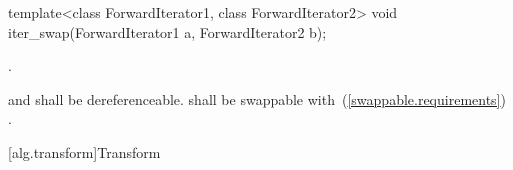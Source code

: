 \begin{removedblock}
%
\begin{itemdecl}
template<class ForwardIterator1, class ForwardIterator2>
  void iter_swap(ForwardIterator1 a, ForwardIterator2 b);
\end{itemdecl}


\begin{itemdescr}
\pnum
\effects
{}.

\pnum
\requires
{} and  shall be dereferenceable.  shall be
swappable with~(\ref{swappable.requirements}) .
\end{itemdescr}
\end{removedblock}

[alg.transform]{Transform}

